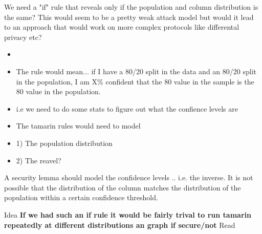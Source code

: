 \documentclass[journal]{IEEEtran}
\begin{document}
We need a "if" rule that reveals only if the population and column distribution is the same? This would seem to be a pretty weak attack model but would it lead to an approach that would work on more complex protocols like differental privacy etc?
\begin{itemize}
\item 
\item The rule would mean... if I have a 80/20 split in the data and an 80/20 split in the population, I am X\% confident that the 80 value in the sample is the 80 value in the population.
\item i.e we need to do some stats to figure out what the confience levels are
\item The tamarin rules would need to model
\item 1) The population distribution
\item 2) The reavel?
\end{itemize}

A security lemma should model the confidence levels .. i.e. the inverse. It is not possible that the distribution of the column matches the distribution of the population within a certain confidence threshold.

Idea
\textbf{If we had such an if rule it would be fairly trival to run tamarin repeatedly at different distributions an graph if secure/not
}
Read \cite{Ismal2012}






\end{document}
